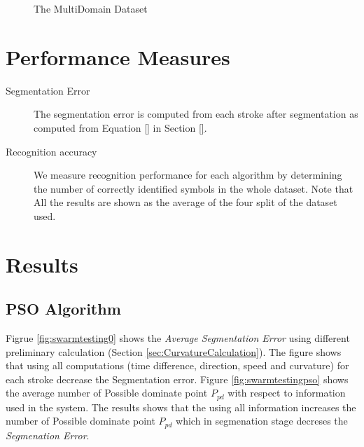 \begin{figure}[]\centering
{}
	\caption{The MultiDomain Dataset }
	\label{fig:MultisymbolSet}
\end{figure}

\section{Performance Measures }
\label{sec:PerformanceMeasures}

\begin{description}
	\item[Segmentation Error] The segmentation error is computed from each stroke after segmentation as computed from Equation \ref{} in Section \ref{}. 
	\item [Recognition accuracy] We measure recognition performance for each algorithm by determining the number of correctly identified symbols in the whole dataset. Note that All the results are shown as the average of the four split of the dataset used. 
\end{description}

 

\section{Results}
\label{sec:ResultsDetails}

\subsection{PSO Algorithm}
\label{sec:PSO}

Figrue \ref{fig:swarmtesting0} shows the \textit{Average Segmentation Error} using different preliminary calculation (Section \ref{sec:CurvatureCalculation}). The figure shows that using all computations (time difference, direction, speed and curvature) for each stroke decrease the Segmentation error. Figure \ref{fig:swarmtestingpso} shows the average number of Possible dominate point $P_{pd}$ with respect to information used in the system. The results shows that the using all information increases the number of Possible dominate point $P_{pd}$ which in segmenation stage decreses the \textit{Segmenation Error}. 


